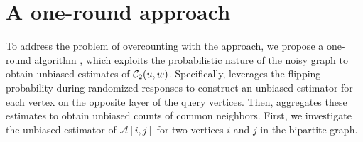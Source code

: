 \section{A one-round approach}
\label{sec:bs}

To address the problem of overcounting with the \naive approach, we propose a one-round algorithm \bs, which exploits the probabilistic nature of the noisy graph to obtain unbiased estimates of $\mathcal{C}_2(u,w)$. 
Specifically, \bs leverages the flipping probability during randomized responses to construct an unbiased estimator for each vertex on the opposite layer of the query vertices. 
Then, \bs aggregates these estimates to obtain unbiased counts of common neighbors. 
First, we investigate the unbiased estimator of $\mathcal{A}[i,j]$ for two vertices $i$ and $j$ in the bipartite graph. 



